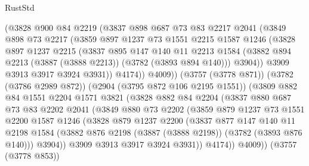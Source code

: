 \begin{lexlean}{RustStd}
\begin{coremodule}
              (@3828
                @900
                @84
                @2219
                (@3837
                  @898
                  @687
                  @73
                  @83
                  @2217
                  @2041
                  (@3849
                    @898
                    @73
                    @2217
                    (@3859
                      @897
                      @1237
                      @73
                      @1551
                      @2215
                      @1587
                      @1246
                      (@3828
                        @897
                        @1237
                        @2215
                        (@3837
                          @895
                          @147
                          @140
                          @11
                          @2213
                          @1584
                          (@3882 @894 @2213 (@3887 (@3888 @2213)) (@3782 (@3893 @894 @140)))
                          @3904))
                      @3909
                      @3913
                      @3917
                      @3924
                      @3931))
                  @4174))
              @4009))
          (@3757 (@3778 @871))
          (@3782 (@3786 @2989 @872))
          (@2904 (@3795 @872 @106 @2195 @1551))
          (@3809
            @882
            @84
            @1551
            @2204
            @1571
            @3821
            (@3828
              @882
              @84
              @2204
              (@3837
                @880
                @687
                @73
                @83
                @2202
                @2041
                (@3849
                  @880
                  @73
                  @2202
                  (@3859
                    @879
                    @1237
                    @73
                    @1551
                    @2200
                    @1587
                    @1246
                    (@3828
                      @879
                      @1237
                      @2200
                      (@3837
                        @877
                        @147
                        @140
                        @11
                        @2198
                        @1584
                        (@3882 @876 @2198 (@3887 (@3888 @2198)) (@3782 (@3893 @876 @140)))
                        @3904))
                    @3909
                    @3913
                    @3917
                    @3924
                    @3931))
                @4174))
            @4009))
        (@3757 (@3778 @853))

\end{coremodule}
\end{lexlean}
